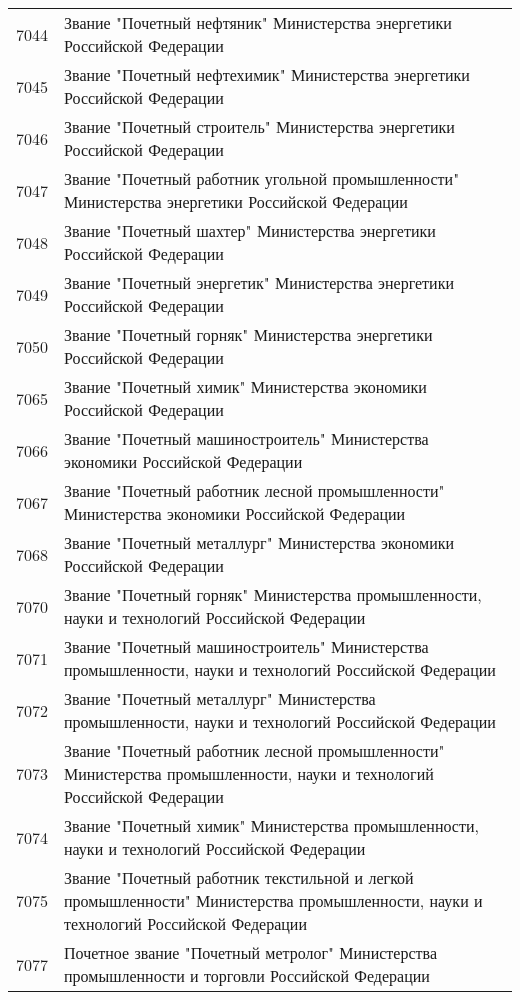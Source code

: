 \documentclass[10pt, a4paper, titlepage]{article}
\begin{document}
\begin{center}
\begin{longtable}{rp{}}
        7044 & Звание "Почетный нефтяник" Министерства энергетики Российской Федерации \\
        7045 & Звание "Почетный нефтехимик" Министерства энергетики Российской Федерации \\
        7046 & Звание "Почетный строитель" Министерства энергетики Российской Федерации \\
        7047 & Звание "Почетный работник угольной промышленности" Министерства энергетики Российской Федерации \\
        7048 & Звание "Почетный шахтер" Министерства энергетики Российской Федерации \\
        7049 & Звание "Почетный энергетик" Министерства энергетики Российской Федерации \\
        7050 & Звание "Почетный горняк" Министерства энергетики Российской Федерации \\
        7065 & Звание "Почетный химик" Министерства экономики Российской Федерации \\
        7066 & Звание "Почетный машиностроитель" Министерства экономики Российской Федерации \\
        7067 & Звание "Почетный работник лесной промышленности" Министерства экономики Российской Федерации \\
        7068 & Звание "Почетный металлург" Министерства экономики Российской Федерации \\
        7070 & Звание "Почетный горняк" Министерства промышленности, науки и технологий Российской Федерации \\
        7071 & Звание "Почетный машиностроитель" Министерства промышленности, науки и технологий Российской Федерации \\
        7072 & Звание "Почетный металлург" Министерства промышленности, науки и технологий Российской Федерации \\
        7073 & Звание "Почетный работник лесной промышленности" Министерства промышленности, науки и технологий Российской Федерации \\
        7074 & Звание "Почетный химик" Министерства промышленности, науки и технологий Российской Федерации \\
        7075 & Звание "Почетный работник текстильной и легкой промышленности" Министерства промышленности, науки и технологий Российской Федерации \\
        7077 & Почетное звание "Почетный метролог" Министерства промышленности и торговли Российской Федерации \\

\end{longtable}
\end{center}
\end{document}
